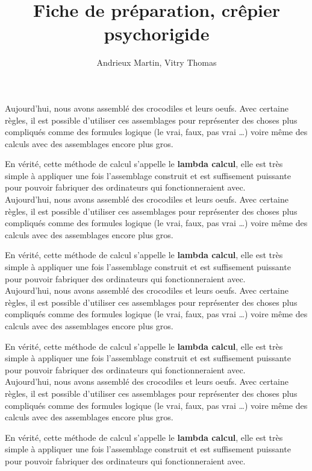 \documentclass[french, a4paper, 11pt]{article}
\title{Fiche de préparation, crêpier psychorigide}
\author{Andrieux Martin, Vitry Thomas}
\date{}
\begin{document}
    Aujourd'hui, nous avons assemblé des crocodiles et leurs oeufs. Avec certaine règles, il est possible d'utiliser ces assemblages pour représenter des choses plus compliqués comme des formules logique (le vrai, faux, pas vrai \dots) voire même des calculs avec des assemblages encore plus gros.
    
    En vérité, cette méthode de calcul s'appelle le \textbf{lambda calcul}, elle est très simple à appliquer une fois l'assemblage construit et est suffisement puissante pour pouvoir fabriquer des ordinateurs qui fonctionneraient avec.\\

    Aujourd'hui, nous avons assemblé des crocodiles et leurs oeufs. Avec certaine règles, il est possible d'utiliser ces assemblages pour représenter des choses plus compliqués comme des formules logique (le vrai, faux, pas vrai \dots) voire même des calculs avec des assemblages encore plus gros.
    
    En vérité, cette méthode de calcul s'appelle le \textbf{lambda calcul}, elle est très simple à appliquer une fois l'assemblage construit et est suffisement puissante pour pouvoir fabriquer des ordinateurs qui fonctionneraient avec.\\

    Aujourd'hui, nous avons assemblé des crocodiles et leurs oeufs. Avec certaine règles, il est possible d'utiliser ces assemblages pour représenter des choses plus compliqués comme des formules logique (le vrai, faux, pas vrai \dots) voire même des calculs avec des assemblages encore plus gros.
    
    En vérité, cette méthode de calcul s'appelle le \textbf{lambda calcul}, elle est très simple à appliquer une fois l'assemblage construit et est suffisement puissante pour pouvoir fabriquer des ordinateurs qui fonctionneraient avec.\\

    Aujourd'hui, nous avons assemblé des crocodiles et leurs oeufs. Avec certaine règles, il est possible d'utiliser ces assemblages pour représenter des choses plus compliqués comme des formules logique (le vrai, faux, pas vrai \dots) voire même des calculs avec des assemblages encore plus gros.
    
    En vérité, cette méthode de calcul s'appelle le \textbf{lambda calcul}, elle est très simple à appliquer une fois l'assemblage construit et est suffisement puissante pour pouvoir fabriquer des ordinateurs qui fonctionneraient avec.\\
\end{document}
